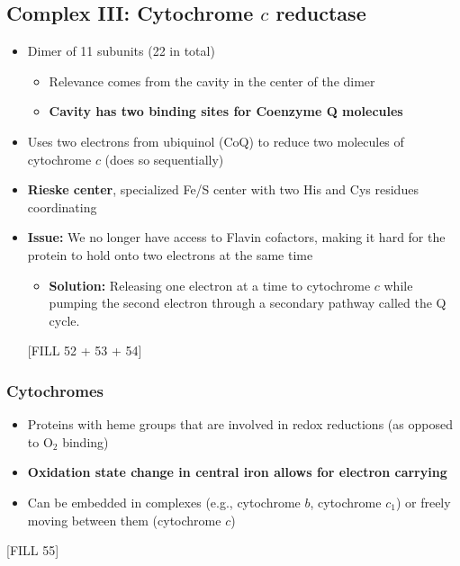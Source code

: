 \documentclass[10pt]{article}
\begin{document}
\subsection*{Complex III: Cytochrome $c$ reductase}
\begin{itemize}
	\item Dimer of 11 subunits (22 in total)
	\begin{itemize}
        \item Relevance comes from the cavity in the center of the dimer
        \item \textbf{Cavity has two binding sites for Coenzyme Q molecules}
    \end{itemize}
	\item Uses two electrons from ubiquinol (CoQ) to reduce two molecules of cytochrome $c$ (does so sequentially)
	\item \textbf{Rieske center}, specialized Fe/S center with two His and Cys residues coordinating
	\item \textbf{Issue:} We no longer have access to Flavin cofactors, making it hard for the protein to hold onto two electrons at the same time
	\begin{itemize}
        \item \textbf{Solution:} Releasing one electron at a time to cytochrome $c$ while pumping the second electron through a secondary pathway called the Q cycle.
    \end{itemize}
    \begin{center} 
        [FILL 52 + 53 + 54]
    \end{center}
\end{itemize}

\subsubsection*{Cytochromes}
\begin{itemize}
	\item Proteins with heme groups that are involved in redox reductions (as opposed to O$_2$ binding)
	\item \textbf{Oxidation state change in central iron allows for electron carrying}
	\item Can be embedded in complexes (e.g., cytochrome $b$, cytochrome $c_1$) or freely moving between them (cytochrome $c$)
\end{itemize}
\begin{center} 
	[FILL 55]
\end{center}
\end{document}
